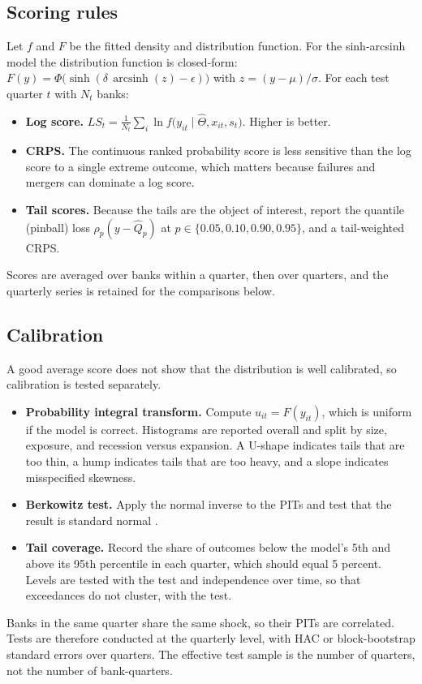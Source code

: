 \documentclass[11pt]{article}
\newcommand{\asinh}{\operatorname{arcsinh}}
\begin{document}
\subsection{Scoring rules}

Let $f$ and $F$ be the fitted density and distribution function. For the sinh-arcsinh model the distribution function is closed-form: $F(y)=\Phi\!\big(\sinh(\delta\,\asinh(z)-\epsilon)\big)$ with $z=(y-\mu)/\sigma$. For each test quarter $t$ with $N_t$ banks:
\begin{itemize}
  \item \textbf{Log score.} $LS_t=\frac{1}{N_t}\sum_i \ln f\big(y_{it}\mid\hat\Theta,x_{it},s_t\big)$. Higher is better.
  \item \textbf{CRPS.} The continuous ranked probability score is less sensitive than the log score to a single extreme outcome, which matters because failures and mergers can dominate a log score.
  \item \textbf{Tail scores.} Because the tails are the object of interest, report the quantile (pinball) loss $\rho_p(y-\hat Q_p)$ at $p\in\{0.05,0.10,0.90,0.95\}$, and a tail-weighted CRPS.
\end{itemize}
Scores are averaged over banks within a quarter, then over quarters, and the quarterly series is retained for the comparisons below.

\subsection{Calibration}

A good average score does not show that the distribution is well calibrated, so calibration is tested separately.
\begin{itemize}
  \item \textbf{Probability integral transform.} Compute $u_{it}=F(y_{it})$, which is uniform if the model is correct. Histograms are reported overall and split by size, exposure, and recession versus expansion. A U-shape indicates tails that are too thin, a hump indicates tails that are too heavy, and a slope indicates misspecified skewness.
  \item \textbf{Berkowitz test.} Apply the normal inverse to the PITs and test that the result is standard normal \citep{berkowitz2001}.
  \item \textbf{Tail coverage.} Record the share of outcomes below the model's 5th and above its 95th percentile in each quarter, which should equal 5 percent. Levels are tested with the \citet{kupiec1995} test and independence over time, so that exceedances do not cluster, with the \citet{christoffersen1998} test.
\end{itemize}
Banks in the same quarter share the same shock, so their PITs are correlated. Tests are therefore conducted at the quarterly level, with HAC or block-bootstrap standard errors over quarters. The effective test sample is the number of quarters, not the number of bank-quarters.
\end{document}
